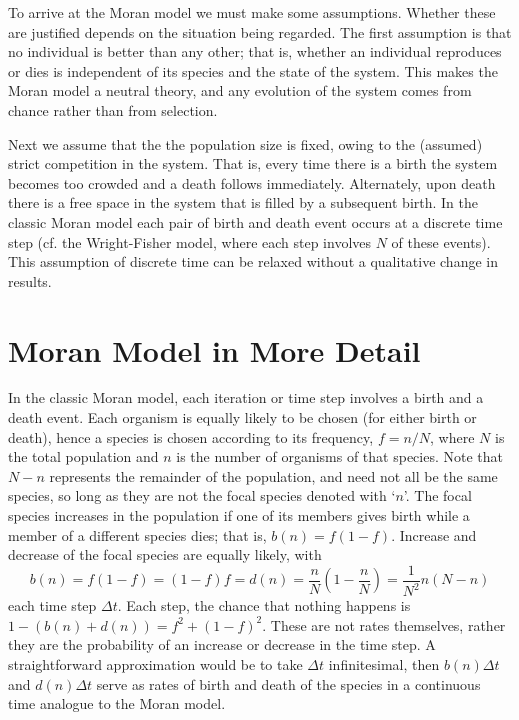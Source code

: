 To arrive at the Moran model we must make some assumptions.
Whether these are justified depends on the situation being regarded.
The first assumption is that no individual is better than any other; that is, whether an individual reproduces or dies is independent of its species and the state of the system.
This makes the Moran model a neutral theory, and any evolution of the system comes from chance rather than from selection.

Next we assume that the the population size is fixed, owing to the (assumed) strict competition in the system.
That is, every time there is a birth the system becomes too crowded and a death follows immediately. Alternately, upon death there is a free space in the system that is filled by a subsequent birth.
In the classic Moran model each pair of birth and death event occurs at a discrete time step (cf. the Wright-Fisher model, where each step involves $N$ of these events).
This assumption of discrete time can be relaxed without a qualitative change in results.


\section{Moran Model in More Detail}
In the classic Moran model, each iteration or time step involves a birth and a death event.
Each organism is equally likely to be chosen (for either birth or death), hence a species is chosen according to its frequency, $f=n/N$, where $N$ is the total population and $n$ is the number of organisms of that species.
Note that $N-n$ represents the remainder of the population, and need not all be the same species, so long as they are not the focal species denoted with `$n$'.
The focal species increases in the population if one of its members gives birth while a member of a different species dies; that is, $b(n) = f(1-f)$.
Increase and decrease of the focal species are equally likely, with
\begin{equation}
b(n) = f(1-f) = (1-f)f = d(n) = \frac{n}{N}\left(1-\frac{n}{N}\right) = \frac{1}{N^2}n(N-n)
\end{equation}
each time step $\Delta t$.
Each step, the chance that nothing happens is $1-\left(b(n)+d(n)\right) = f^2 + (1-f)^2$.
These are not rates themselves, rather they are the probability of an increase or decrease in the time step.
A straightforward approximation would be to take $\Delta t$ infinitesimal, then $b(n)\Delta t$ and $d(n)\Delta t$ serve as rates of birth and death of the species in a continuous time analogue to the Moran model.

